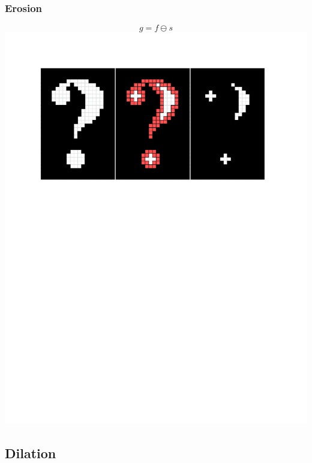 \documentclass{beamer}
\begin{document}
\begin{frame}
\frametitle{Erosion}
\begin{center}
\begin{equation*}
g = f \ominus s
\end{equation*}
\includegraphics[width=1\textwidth,trim={0 0 0 0.5in},clip]{erosion}
\end{center}
\end{frame}

\subsection[Dilation]{Dilation}
\end{document}
